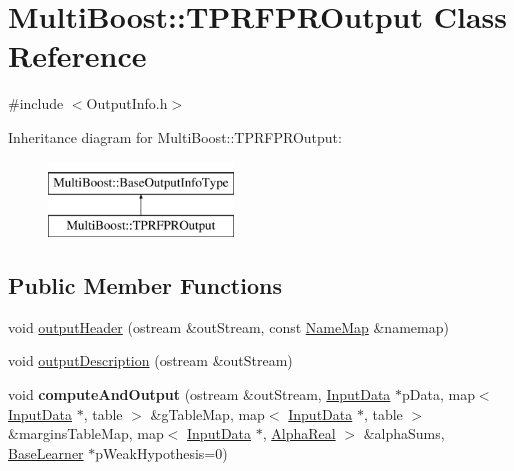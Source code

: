 \hypertarget{classMultiBoost_1_1TPRFPROutput}{\section{Multi\-Boost\-:\-:T\-P\-R\-F\-P\-R\-Output Class Reference}
\label{classMultiBoost_1_1TPRFPROutput}
}


{\ttfamily \#include $<$Output\-Info.\-h$>$}

Inheritance diagram for Multi\-Boost\-:\-:T\-P\-R\-F\-P\-R\-Output\-:\begin{figure}[H]
\begin{center}
\leavevmode
\includegraphics[height=2.000000cm]{classMultiBoost_1_1TPRFPROutput}
\end{center}
\end{figure}
\subsection*{Public Member Functions}
\begin{DoxyCompactItemize}
\item 
void \hyperlink{classMultiBoost_1_1TPRFPROutput_a15b115b85bd48dfcf885b7c72242b46b}{output\-Header} (ostream \&out\-Stream, const \hyperlink{classMultiBoost_1_1NameMap}{Name\-Map} \&namemap)
\item 
void \hyperlink{classMultiBoost_1_1TPRFPROutput_a61a6265361d9a9c74b772f513b7caa21}{output\-Description} (ostream \&out\-Stream)
\item 
\hypertarget{classMultiBoost_1_1TPRFPROutput_a882fcd5ba86d97f20e86a840f9779a5e}{void {\bfseries compute\-And\-Output} (ostream \&out\-Stream, \hyperlink{classMultiBoost_1_1InputData}{Input\-Data} $\ast$p\-Data, map$<$ \hyperlink{classMultiBoost_1_1InputData}{Input\-Data} $\ast$, table $>$ \&g\-Table\-Map, map$<$ \hyperlink{classMultiBoost_1_1InputData}{Input\-Data} $\ast$, table $>$ \&margins\-Table\-Map, map$<$ \hyperlink{classMultiBoost_1_1InputData}{Input\-Data} $\ast$, \hyperlink{Defaults_8h_a80184c4fd10ab70a1a17c5f97dcd1563}{Alpha\-Real} $>$ \&alpha\-Sums, \hyperlink{classMultiBoost_1_1BaseLearner}{Base\-Learner} $\ast$p\-Weak\-Hypothesis=0)}\label{classMultiBoost_1_1TPRFPROutput_a882fcd5ba86d97f20e86a840f9779a5e}

\end{DoxyCompactItemize}

